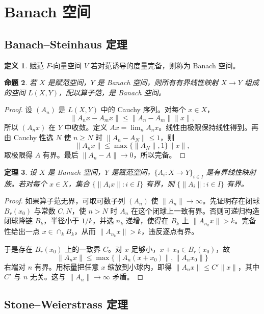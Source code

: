 \documentclass[11pt,a4paper,openany]{ctexbook}
\numberwithin{equation}{chapter}
\theoremstyle{plain}
\newtheorem{theorem}{定理}[chapter]
\newtheorem{proposition}[theorem]{命题}
\theoremstyle{definition}
\newtheorem{definition}[theorem]{定义}
\theoremstyle{remark}
\begin{document}
\section{Banach 空间}

\subsection{Banach--Steinhaus 定理}

\begin{definition}
赋范 $F$-向量空间 $V$ 若对范诱导的度量完备，则称为 Banach 空间。
\end{definition}

\begin{proposition}
若 $X$ 是赋范空间，$Y$ 是 Banach 空间，则所有有界线性映射 $X\to Y$ 组成的空间 $L(X,Y)$，配以算子范，是 Banach 空间。
\end{proposition}

\begin{proof}
设 $(A_n)$ 是 $L(X,Y)$ 中的 Cauchy 序列。对每个 $x\in X$，
\[
  \|A_nx-A_mx\|\le \|A_n-A_m\|\|x\|,
\]
所以 $(A_nx)$ 在 $Y$ 中收敛。定义 $Ax=\lim_n A_nx$。线性由极限保持线性得到。再由 Cauchy 性选 $N$ 使 $n\ge N$ 时 $\|A_n-A_N\|\le1$，则
\[
  \|A_nx\|\le \max\{\|A_N\|,1\}\|x\|,
\]
取极限得 $A$ 有界。最后 $\|A_n-A\|\to0$，所以完备。
\end{proof}

\begin{theorem}
设 $X$ 是 Banach 空间，$Y$ 是赋范空间，$\{A_i:X\to Y\}_{i\in I}$ 是有界线性映射族。若对每个 $x\in X$，集合 $\{\|A_ix\|:i\in I\}$ 有界，则 $\{\|A_i\|:i\in I\}$ 有界。
\end{theorem}

\begin{proof}
如果算子范无界，可取可数子列 $(A_n)$ 使 $\|A_n\|\to\infty$。先证明存在闭球 $B_r(x_0)$ 与常数 $C,N$，使 $n>N$ 时 $A_n$ 在这个闭球上一致有界。否则可递归构造闭球降链 $B_k$，半径小于 $1/k$，并选 $n_k$ 递增，使得在 $B_k$ 上 $\|A_{n_k}x\|>k$。完备性给出一点 $x\in\cap_kB_k$，从而 $\|A_{n_k}x\|>k$，违反逐点有界。

于是存在 $B_r(x_0)$ 上的一致界 $C$。对 $x$ 足够小，$x+x_0\in B_r(x_0)$，故
\[
  \|A_nx\|\le \max\{\|A_n(x+x_0)\|,\|A_nx_0\|\}
\]
右端对 $n$ 有界。用标量把任意 $x$ 缩放到小球内，即得 $\|A_nx\|\le C'\|x\|$，其中 $C'$ 与 $n$ 无关。这与 $\|A_n\|\to\infty$ 矛盾。
\end{proof}

\subsection{Stone--Weierstrass 定理}
\end{document}
